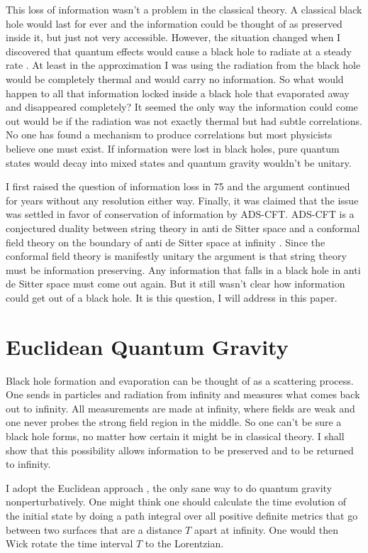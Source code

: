 \documentclass[aps,prd,groupedaddress,showpacs]{revtex4}
\begin{document}
This loss of information wasn't a problem in the classical theory. A classical black hole would last for ever and the information could be thought of as preserved inside it, but just not very accessible. However, the situation changed when I discovered that quantum effects would cause a black hole to radiate at a steady rate \cite{Stephen1}. At least in the approximation I was using the radiation from the black hole would be completely thermal and would carry no information\cite{Stephen2}. So what would happen to all that information locked inside a black hole that evaporated away and disappeared completely?  It seemed the only way the information could come out would be if the radiation was not exactly thermal but had subtle correlations. No one has found a mechanism to produce correlations but most physicists believe one must exist. If information were lost in black holes, pure quantum states would decay into mixed states and quantum gravity wouldn't be unitary.

I first raised the question of information loss in 75 and the argument continued for years without any resolution either way. Finally, it was claimed that the issue was settled in favor of conservation of information by ADS-CFT. 
ADS-CFT is a conjectured duality between string theory in anti de Sitter space and a conformal field theory on the boundary of anti de Sitter space at infinity \cite{ADSCFTreviews }. Since the conformal field theory is manifestly unitary the argument is that string theory must be information preserving. Any information that falls in a black hole in anti de Sitter space must come out again. But it still wasn't clear how information could get out of a black hole. It is this question, I will address in this paper. 

\section{Euclidean Quantum Gravity}


Black hole formation and evaporation can be thought of as a scattering process. One sends in particles and radiation from infinity and measures what comes back out to infinity. All measurements are made at infinity, where fields are weak and one never probes the strong field region in the middle. So one can't be sure a black hole forms, no matter how certain it might be in classical theory. I shall show that this possibility allows information to be preserved and to be returned to infinity. 

I adopt the Euclidean approach \cite{EQG}, the only sane way to do quantum gravity nonperturbatively. One might think one should calculate the time evolution of the initial state by doing a path integral over all positive definite metrics that go between two surfaces that are a distance $T$ apart at infinity. One would then Wick rotate the time interval $T$ to the Lorentzian. 
\end{document}
